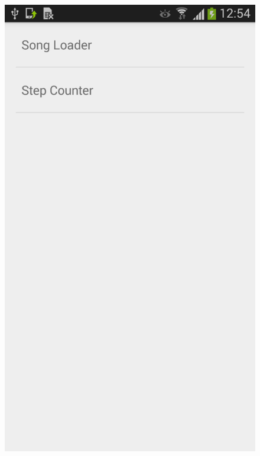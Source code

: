 \begin{figure}
\centering
\begin{minipage}{.5\textwidth}
  \centering
    \includegraphics[scale=0.2]{Images/Screenshots/settings.png}

\end{minipage}
\end{figure}

